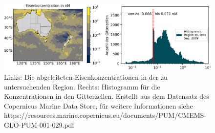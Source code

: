 \documentclass[12pt,a4paper,onecolumn]{scrartcl}
\begin{document}
\begin{figure}
\includegraphics[width=\textwidth]{bilder/nutrient_iron.png}
\caption{Links: Die abgeleiteten Eisenkonzentrationen in der zu untersuchenden Region. Rechts: Histogramm für die Konzentrationen in den Gitterzellen. Erstellt aus dem Datensatz des Copernicus Marine Data Store, für weitere Informationen siehe https://resources.marine.copernicus.eu/documents/PUM/CMEMS-GLO-PUM-001-029.pdf} \label{fig:nutrient_iron}
\end{figure}
\end{document}
